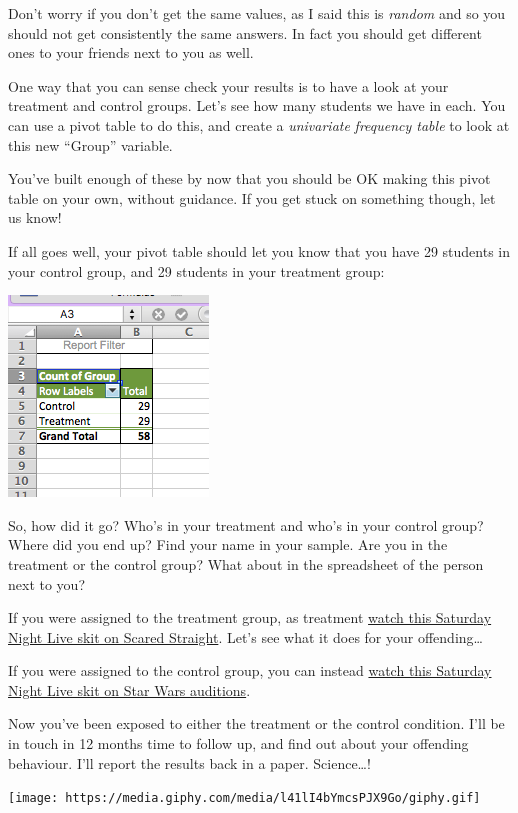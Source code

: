 \documentclass[]{book}
\theoremstyle{definition}
\theoremstyle{definition}
\theoremstyle{definition}
\theoremstyle{remark}
\begin{document}
Don't worry if you don't get the same values, as I said this is
\emph{random} and so you should not get consistently the same answers.
In fact you should get different ones to your friends next to you as
well.

One way that you can sense check your results is to have a look at your
treatment and control groups. Let's see how many students we have in
each. You can use a pivot table to do this, and create a
\emph{univariate} \emph{frequency table} to look at this new ``Group''
variable.

You've built enough of these by now that you should be OK making this
pivot table on your own, without guidance. If you get stuck on something
though, let us know!

If all goes well, your pivot table should let you know that you have 29
students in your control group, and 29 students in your treatment group:

\includegraphics{imgs/freq_groups.png}

So, how did it go? Who's in your treatment and who's in your control
group? Where did you end up? Find your name in your sample. Are you in
the treatment or the control group? What about in the spreadsheet of the
person next to you?

If you were assigned to the treatment group, as treatment
\href{https://www.youtube.com/watch?v=sw1vm_PO8ss}{watch this Saturday
Night Live skit on Scared Straight}. Let's see what it does for your
offending\ldots{}

If you were assigned to the control group, you can instead
\href{https://www.youtube.com/watch?v=-T_pjMr7-n0}{watch this Saturday
Night Live skit on Star Wars auditions}.

Now you've been exposed to either the treatment or the control
condition. I'll be in touch in 12 months time to follow up, and find out
about your offending behaviour. I'll report the results back in a paper.
Science\ldots{}!

\texttt{[image: https://media.giphy.com/media/l41lI4bYmcsPJX9Go/giphy.gif]}
\end{document}
